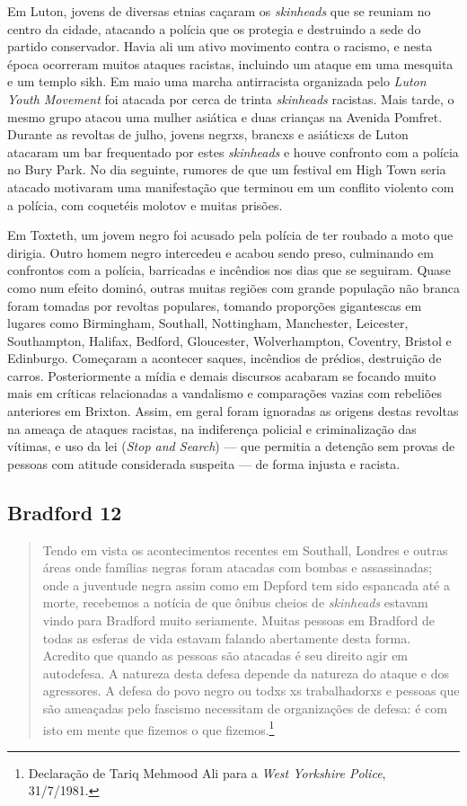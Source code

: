 Em Luton, jovens de diversas etnias caçaram os \emph{skinheads} que se reuniam no centro da cidade, atacando a polícia que os protegia e destruindo a sede do partido conservador. Havia ali um ativo movimento contra o racismo, e nesta época ocorreram muitos ataques racistas, incluindo um ataque em uma mesquita e um templo sikh. Em maio uma marcha antirracista organizada pelo \emph{Luton Youth Movement} foi atacada por cerca de trinta \emph{skinheads} racistas. Mais tarde, o mesmo grupo atacou uma mulher asiática e duas crianças na Avenida Pomfret. Durante as revoltas de julho, jovens negrxs, brancxs e asiáticxs de Luton atacaram um bar frequentado por estes \emph{skinheads} e houve confronto com a polícia no Bury Park. No dia seguinte, rumores de que um festival em High Town seria atacado motivaram uma manifestação que terminou em um conflito violento com a polícia, com coquetéis molotov e muitas prisões.

Em Toxteth, um jovem negro foi acusado pela polícia de ter roubado a moto que dirigia. Outro homem negro intercedeu e acabou sendo preso, culminando em confrontos com a polícia, barricadas e incêndios nos dias que se seguiram. Quase como num efeito dominó, outras muitas regiões com grande população não branca foram tomadas por revoltas populares, tomando proporções gigantescas em lugares como Birmingham, Southall, Nottingham, Manchester, Leicester, Southampton, Halifax, Bedford, Gloucester, Wolverhampton, Coventry, Bristol e Edinburgo. Começaram a acontecer saques, incêndios de prédios, destruição de carros. Posteriormente a mídia e demais discursos acabaram se focando muito mais em críticas relacionadas a vandalismo e comparações vazias com rebeliões anteriores em Brixton. Assim, em geral foram ignoradas as origens destas revoltas na ameaça de ataques racistas, na indiferença policial e criminalização das vítimas, e uso da lei  (\emph{Stop and Search}) --- que permitia a detenção sem provas de pessoas com atitude considerada suspeita --- de forma injusta e racista.

\subsection{Bradford 12}

\begin{quote}
Tendo em vista os acontecimentos recentes em Southall, Londres e outras áreas onde famílias negras foram atacadas com bombas e assassinadas; onde a juventude negra assim como em Depford tem sido espancada até a morte, recebemos a notícia de que ônibus cheios de \emph{skinheads} estavam vindo para Bradford muito seriamente. Muitas pessoas em Bradford de todas as esferas de vida estavam falando abertamente desta forma. Acredito que quando as pessoas são atacadas é seu direito agir em autodefesa. A natureza desta defesa depende da natureza do ataque e dos agressores. A defesa do povo negro ou todxs xs trabalhadorxs e pessoas que são ameaçadas pelo fascismo necessitam de organizações de defesa: é com isto em mente que fizemos o que fizemos.\footnote{Declaração de Tariq Mehmood Ali para a \textit{West Yorkshire Police}, 31/7/1981.}
\end{quote}

